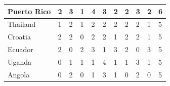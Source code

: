 \documentclass[12pt]{article}  %
\begin{document}
\begin{subappendices}
\begin{longtable}{|l|l|l|l|l|l|l|l|l|l|l|}
	\hline
	Puerto Rico                                                    & 2                                                 & 3                                                 & 1                                                 & 4                                                 & 3                                                 & 2                                                 & 2    & 3      & 2      & 6      \\ 
	\hline
	Thailand                                                       & 1                                                 & 2                                                 & 1                                                 & 2                                                 & 2                                                 & 2                                                 & 2    & 2      & 1      & 5      \\ 
	\hline
	Croatia                                                        & 2                                                 & 2                                                 & 0                                                 & 2                                                 & 2                                                 & 1                                                 & 2    & 2      & 1      & 5      \\ 
	\hline
	Ecuador                                                        & 2                                                 & 0                                                 & 2                                                 & 3                                                 & 1                                                 & 3                                                 & 2    & 0      & 3      & 5      \\ 
	\hline
	Uganda                                                         & 0                                                 & 1                                                 & 1                                                 & 1                                                 & 4                                                 & 1                                                 & 1    & 3      & 1      & 5      \\ 
	\hline
	Angola                                                         & 0                                                 & 2                                                 & 0                                                 & 1                                                 & 3                                                 & 1                                                 & 0    & 2      & 0      & 5      \\ 

\end{longtable}
\end{subappendices}
\end{document}
